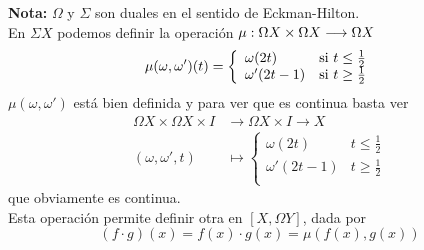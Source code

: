 \textbf{Nota:} $\Omega$ y $\Sigma$ son duales en el sentido de Eckman-Hilton.\\

\noindent En $\Sigma X$ podemos definir la operación  $\mu : \Omega X \times \Omega X \longrightarrow \nobreak \Omega X$
\[
\mu(\omega, \omega')(t) = 
\left\{ \begin{array}{ll}
             \omega(2t)		&   $si $ t \leq \frac{1}{2} \\
             \omega'(2t-1)	&   $si $ t \geq \frac{1}{2} \\
        \end{array}
\right.
\]
$\mu(\omega, \omega')$ está bien definida y para ver que es continua basta ver
\begin{align*}
\Omega X \times \Omega X \times I &\longrightarrow \Omega X \times I \longrightarrow X \\
(\omega, \omega', t) &\longmapsto 
\left\{ \begin{array}{ll}
             \omega(2t)		&  t \leq \frac{1}{2} \\
             \omega'(2t-1)	&  t \geq \frac{1}{2} \\
        \end{array}
\right.
\end{align*}
que obviamente es continua. \\
Esta operación permite definir otra en $[X, \Omega Y]$, dada por 
\[ (f \cdotp g)(x) = f(x) \cdotp g(x) = \mu(f(x), g(x)) \]

